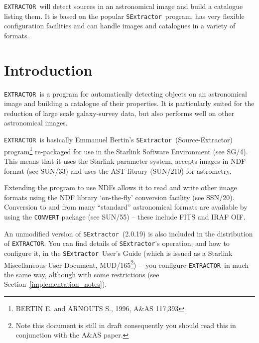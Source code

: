 \documentclass[twoside,11pt]{article}
\newcommand{\stardocinitials}  {SUN}
\newcommand{\stardocnumber}    {226.2}
\newcommand{\stardocabstract}  {\EXTRACTOR\ will detect sources in
an astronomical image and build a catalogue listing them. It is based on the
popular \SExtractor\ program, has very flexible configuration
facilities and can handle images and catalogues in a variety of formats.}
\newcommand{\stardocname}{\stardocinitials /\stardocnumber}
\newcommand{\htmladdnormallink}[2]{#1}
\newcommand{\htmlref}[2]{#1}
\newenvironment{latexonly}{}{}
\newcommand{\latex}[1]{#1}
\newcommand{\xref}[3]{#1}
\newcommand{\xlabel}[1]{}
\renewcommand{\_}{\texttt{\symbol{95}}}
\newcommand{\EXTRACTOR}{\texttt{EXTRACTOR}}
\newcommand{\CONVERT}{\texttt{CONVERT}}
\newcommand{\SExtractor}{\texttt{SExtractor}}
\newcommand{\IRAFURL}{http://star-www.rl.ac.uk/iraf/web/iraf-homepage.html}
\newcommand{\FITSURL}{http://fits.gsfc.nasa.gov/}
\newcommand{\MUD}{mud165.ps}
\newcommand{\dash}{--}
\newcommand{\dash}{-}
\renewcommand{\thepage}{\roman{page}}
\begin{document}
\stardocabstract
  \newpage
  \begin{latexonly}
    \setlength{\parskip}{0mm}
    \tableofcontents
    \setlength{\parskip}{\medskipamount}
    \markboth{\stardocname}{\stardocname}
  \end{latexonly}
\cleardoublepage
\renewcommand{\thepage}{\arabic{page}}
\setcounter{page}{1}

\section{\xlabel{introduction}Introduction}
\EXTRACTOR\ is a program for automatically detecting objects on an
astronomical image and building a catalogue of their properties. It is
particularly suited for the reduction of large scale galaxy-survey
data, but also performs well on other astronomical images.

\EXTRACTOR\ is basically Emmanuel Bertin's \SExtractor\
(Source-Extractor) program\footnote{BERTIN E. and ARNOUTS S., 1996,
A\&AS 117,393} re-packaged for use in the \xref{Starlink Software
Environment}{sg4}{}\latex{ (see SG/4)}.  This means that it uses the
Starlink parameter system, accepts images in
\xref{NDF}{sun33}{abstract} format \latex{(see SUN/33)} and uses the
\xref{AST}{sun210}{} library \latex{(SUN/210)} for astrometry.

Extending the program to use NDFs allows it to read and write other
image formats using the NDF library \xref{`on-the-fly' conversion
facility}{ssn20}{abstract} \latex{(see SSN/20)}.  Conversion to and
from many ``standard'' astronomical
\xref{formats}{sun55}{the_default_conversion_commands} are available
by using the \xref{\CONVERT}{sun55}{abstract} package \latex{(see
SUN/55)} -- these include \htmladdnormallink{FITS}{\FITSURL} and
\htmladdnormallink{IRAF}{\IRAFURL} OIF.

An unmodified version of \SExtractor\ (2.0.19) is also included in the
distribution of \EXTRACTOR.  You can find details of \SExtractor's
operation, and how to configure it, in the
\htmladdnormallink{\SExtractor\ User's Guide}{\MUD} (which is issued
as a Starlink Miscellaneous User Document, MUD/165\footnote{Note this
document is still in draft consequently you should read this in
conjunction with the A\&AS paper.}) \dash\ you configure \EXTRACTOR\
in much the same way, although with 
\htmlref{some restrictions}{implementation_notes}
\latex{(see Section~\ref{implementation_notes})}.
\end{document}
